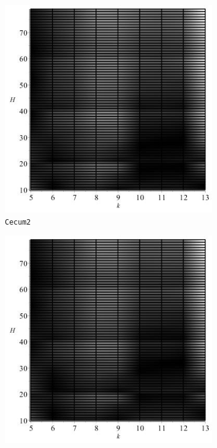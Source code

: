 \documentclass[../../main.tex]{subfiles}
\begin{document}
\begin{figure}[H]
\begin{subfigure}[b]{.5\textwidth}
\includegraphics[width=\textwidth]{precision/minmax/cecum2precise}
\caption{\texttt{Cecum2}}
\end{subfigure}
\begin{subfigure}[b]{.5\textwidth}
\includegraphics[width=\textwidth]{precision/minmax/cecum3precise}

\end{subfigure}
\end{figure}
\end{document}
